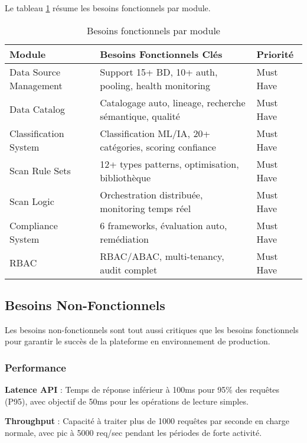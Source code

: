 Le tableau \ref{tab:besoins_fonctionnels} résume les besoins fonctionnels par module.

\begin{table}[htpb]
\centering
\caption{Besoins fonctionnels par module}
\label{tab:besoins_fonctionnels}
\begin{tabular}{|p{}|p{}|p{}|}
\hline
\textbf{Module} & \textbf{Besoins Fonctionnels Clés} & \textbf{Priorité} \\
\hline
Data Source Management & Support 15+ BD, 10+ auth, pooling, health monitoring & Must Have \\
\hline
Data Catalog & Catalogage auto, lineage, recherche sémantique, qualité & Must Have \\
\hline
Classification System & Classification ML/IA, 20+ catégories, scoring confiance & Must Have \\
\hline
Scan Rule Sets & 12+ types patterns, optimisation, bibliothèque & Must Have \\
\hline
Scan Logic & Orchestration distribuée, monitoring temps réel & Must Have \\
\hline
Compliance System & 6 frameworks, évaluation auto, remédiation & Must Have \\
\hline
RBAC & RBAC/ABAC, multi-tenancy, audit complet & Must Have \\
\hline
\end{tabular}
\end{table}

\subsection{Besoins Non-Fonctionnels}

Les besoins non-fonctionnels sont tout aussi critiques que les besoins fonctionnels pour garantir le succès de la plateforme en environnement de production.

\subsubsection{Performance}

\textbf{Latence API} : Temps de réponse inférieur à 100ms pour 95\% des requêtes (P95), avec objectif de 50ms pour les opérations de lecture simples.

\textbf{Throughput} : Capacité à traiter plus de 1000 requêtes par seconde en charge normale, avec pic à 5000 req/sec pendant les périodes de forte activité.

